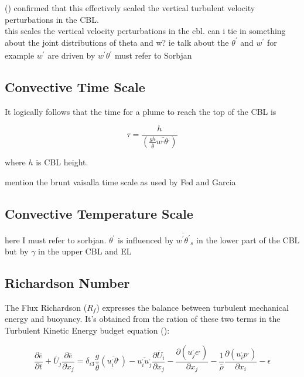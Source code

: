 \citeauthor{Deardorff70} (\cite{Deardorff70}) confirmed that this effectively scaled the vertical turbulent velocity
perturbations in the \acs{CBL}.\\

this scales the vertical velocity perturbations in the cbl. 
can i tie in something about the joint distributions of theta and w?
ie talk about the $\theta^{'}$ and $w^{'}$
for example $w^{'}$ are driven by $\overline{w^{'}\theta^{'}}$
must refer to Sorbjan

\subsection{Convective Time Scale}
\label{}

It logically follows that the time for a plume to reach the top of the \acs{CBL} is

\begin{equation}
\tau = \frac{h}{\left( \frac{gh}{\overline{\theta}}\overline{w^{,}\theta^{,}} \right)}
\end{equation}

where $h$ is \acs{CBL} height.

mention the brunt vaisalla time scale as used by Fed and Garcia

\subsection{Convective Temperature Scale}
\label{}

here I must refer to sorbjan.  $\theta^{'}$ is influenced by $\overline{w^{'}\theta^{'}}_{s}$
in the lower part of the \acs{CBL} but by $\gamma$ in the upper \acs{CBL} and \acs{EL}

\subsection{Richardson Number}
\label{}

The Flux Richardson ($R_{f}$) expresses the balance between turbulent mechanical energy and buoyancy.  It's obtained from the ration of these two terms
 in the Turbulent Kinetic Energy budget equation (\cite{Stull-BLMetIntro}):

\begin{equation}
\frac{\partial \overline{e}}{\partial t} + \overline{U}_{j} \frac{\partial \overline{e}}{\partial x_{j}} = \delta_{i3}  \frac{g}{\overline{\theta}} \left( \overline{u_{i}^{,}\theta^{,}} \right) - \overline{u_{i}^{,}u_{j}^{,}}\frac{\partial \overline{U}_{i}}{\partial x_{j}} - \frac{ \partial \left( u_{j}^{,}e^{,} \right)}{\partial x_{j}} - \frac{1}{\overline{\rho}} \frac{\partial \left( u_{i}^{,} p^{,} \right) }{\partial x_{i}} - \epsilon
\end{equation}

